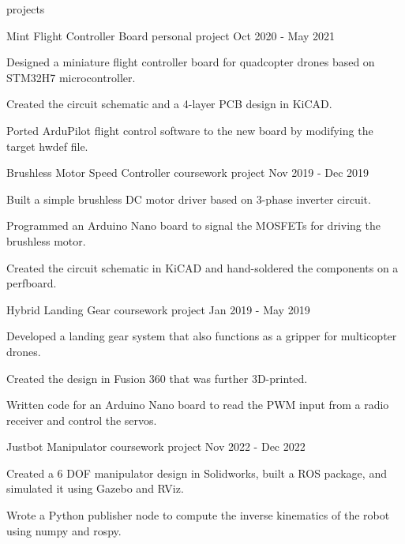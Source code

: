 \begin{section}{projects}
  
  \begin{project}
    {Mint Flight Controller Board}
    {personal project}
    {Oct 2020 - May 2021}

    \item Designed a miniature flight controller board for quadcopter drones based on STM32H7 microcontroller.
    \item Created the circuit schematic and a 4-layer PCB design in KiCAD.
    \item Ported ArduPilot flight control software to the new board by modifying the target hwdef file.
  
  \end{project}

  \begin{project}
    {Brushless Motor Speed Controller}
    {coursework project}
    {Nov 2019 - Dec 2019}

    \item Built a simple brushless DC motor driver based on 3-phase inverter circuit.
    \item Programmed an Arduino Nano board to signal the MOSFETs for driving the brushless motor.
    \item Created the circuit schematic in KiCAD and hand-soldered the components on a perfboard.
  
  \end{project}

  \begin{project}
    {Hybrid Landing Gear}
    {coursework project}
    {Jan 2019 - May 2019}

    \item Developed a landing gear system that also functions as a gripper for multicopter drones.
    \item Created the design in Fusion 360 that was further 3D-printed.
    \item Written code for an Arduino Nano board to read the PWM input from a radio receiver and control the servos.
  
  \end{project}

  \begin{project}
    {Justbot Manipulator}
    {coursework project}
    {Nov 2022 - Dec 2022}

    \item Created a 6 DOF manipulator design in Solidworks, built a ROS package, and simulated it using Gazebo and RViz.
    \item Wrote a Python publisher node to compute the inverse kinematics of the robot using numpy and rospy.
  
  \end{project}

\end{section}